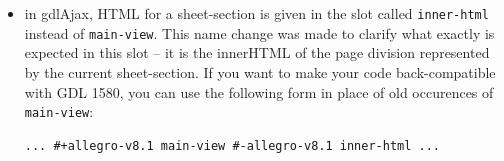 \documentclass [11pt]{book}
\begin{document}
\begin{itemize}
\item in gdlAjax, HTML for a sheet-section is given in the slot called \texttt{inner-html} instead of \texttt{main-view}. This name change was made to clarify what exactly is
	 expected in this slot -- it is the innerHTML of the page
	 division represented by the current sheet-section. If you
	 want to make your code back-compatible with GDL 1580, you can
	 use the following form in place of old occurences of \texttt{main-view}: 

\begin{verbatim}... #+allegro-v8.1 main-view #-allegro-v8.1 inner-html ...
\end{verbatim}

\end{itemize}



\backmatter



\printindex
\end{document}
